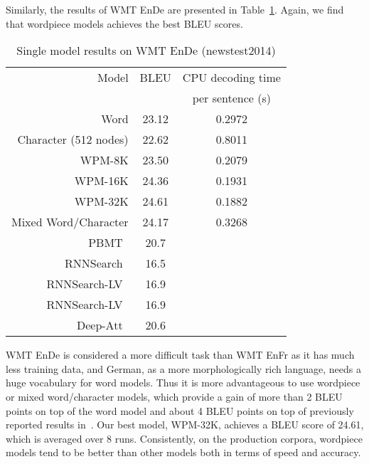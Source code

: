 Similarly, the results of WMT EnDe are presented in
Table~\ref{table:wmt_en_de}. Again, we find that wordpiece models
achieves the best BLEU scores.

\begin{table}[h!]
\caption{Single model results on WMT EnDe (newstest2014)} \label{table:wmt_en_de}
\centering
\begin{tabular}{r c c }
\hline\hline Model     & BLEU        & CPU decoding time    \\
                 &             & per sentence (s) \\ \hline
       Word                  & 23.12   & 0.2972           \\
       Character (512 nodes) & 22.62   & 0.8011           \\
       WPM-8K                & 23.50   & 0.2079           \\
       WPM-16K               & 24.36   & 0.1931           \\
       WPM-32K               & 24.61   & 0.1882           \\
       Mixed Word/Character  & 24.17   & 0.3268           \\ 
\hline
       PBMT~\cite{buck2014n}                           & 20.7     & \\
       RNNSearch~\cite{jean2015using} & 16.5            \\
       RNNSearch-LV~\cite{jean2015using} & 16.9          \\
       RNNSearch-LV~\cite{jean2015using} & 16.9          \\
       Deep-Att~\cite{DBLP:journals/corr/ZhouCWLX16} & 20.6    & \\
\hline \end{tabular}
\end{table}



WMT EnDe
is considered a more difficult task than WMT EnFr as
it has much less training data, and German, as a more morphologically
rich language, needs a huge vocabulary for word models.  Thus it is
more advantageous to use wordpiece or mixed word/character models,
which provide a gain of more than 2 BLEU points on top of the
word model and about 4 BLEU points on top of previously reported results
in~\cite{buck2014n,DBLP:journals/corr/ZhouCWLX16}.
Our best model, WPM-32K, achieves a BLEU score of 24.61, which is averaged over 8 runs.
Consistently, on the production corpora, wordpiece models tend
to be better than other models both in terms of speed and accuracy.



